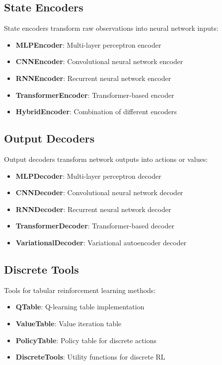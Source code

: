 \subsection{State Encoders}

State encoders transform raw observations into neural network inputs:

\begin{itemize}
    \item \textbf{MLPEncoder}: Multi-layer perceptron encoder
    \item \textbf{CNNEncoder}: Convolutional neural network encoder
    \item \textbf{RNNEncoder}: Recurrent neural network encoder
    \item \textbf{TransformerEncoder}: Transformer-based encoder
    \item \textbf{HybridEncoder}: Combination of different encoders
\end{itemize}

\subsection{Output Decoders}

Output decoders transform network outputs into actions or values:

\begin{itemize}
    \item \textbf{MLPDecoder}: Multi-layer perceptron decoder
    \item \textbf{CNNDecoder}: Convolutional neural network decoder
    \item \textbf{RNNDecoder}: Recurrent neural network decoder
    \item \textbf{TransformerDecoder}: Transformer-based decoder
    \item \textbf{VariationalDecoder}: Variational autoencoder decoder
\end{itemize}

\subsection{Discrete Tools}

Tools for tabular reinforcement learning methods:

\begin{itemize}
    \item \textbf{QTable}: Q-learning table implementation
    \item \textbf{ValueTable}: Value iteration table
    \item \textbf{PolicyTable}: Policy table for discrete actions
    \item \textbf{DiscreteTools}: Utility functions for discrete RL
\end{itemize}

